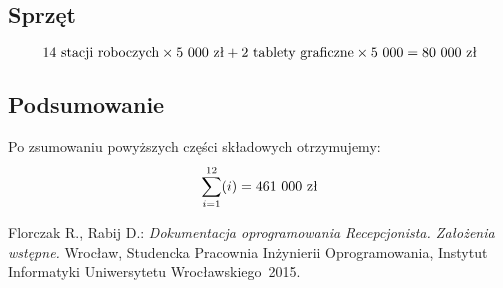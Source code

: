 \documentclass [11pt, a4paper, leqno] {article}
\begin{document}
\subsection{Sprzęt}
\noindent
\begin{equation}14 \text{ stacji roboczych} \times 5\\\ 000 \text{ zł} + 2 \text{ tablety graficzne} \times 5\\\ 000 = 80\\\ 000 \text{ zł} \end{equation}

\subsection{Podsumowanie}
\noindent
Po zsumowaniu powyższych części składowych otrzymujemy:
\begin{equation}
\sum\limits_{i=1}^{12} (i) = 461\\\ 000 \text{ zł}
\end{equation}

\newpage
{}
\begin{thebibliography}{2}
	 Florczak R., Rabij D.: \emph{Dokumentacja oprogramowania Recepcjonista. Założenia wstępne.} Wrocław, Studencka Pracownia Inżynierii Oprogramowania, Instytut Informatyki Uniwersytetu Wrocławskiego~2015.
\end{thebibliography}
\end{document}
